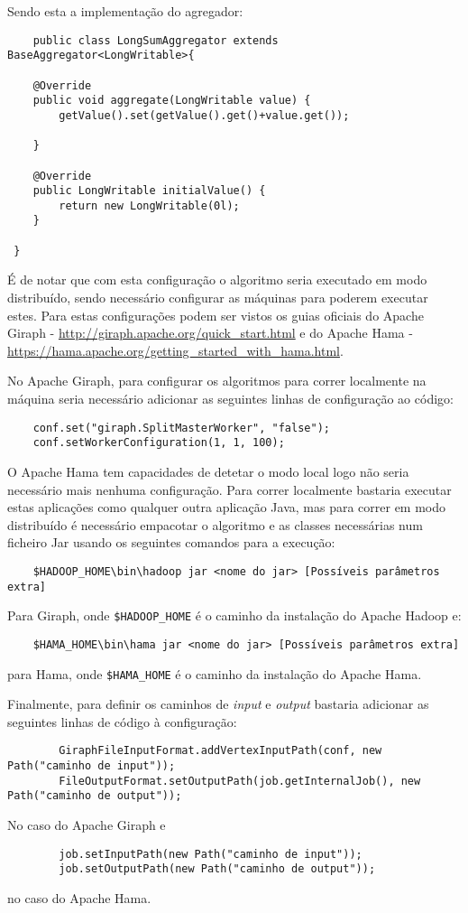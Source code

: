	Sendo esta a implementação do agregador:
	\begin{verbatim}
	public class LongSumAggregator extends BaseAggregator<LongWritable>{

	@Override
	public void aggregate(LongWritable value) {
		getValue().set(getValue().get()+value.get());
		
	}

	@Override
	public LongWritable initialValue() {
		return new LongWritable(0l);
	}

 }
	\end{verbatim}
	É de notar que com esta configuração o algoritmo seria executado em modo distribuído, sendo necessário configurar as máquinas para poderem executar estes. Para estas configurações podem ser vistos os guias oficiais do Apache Giraph - \url{http://giraph.apache.org/quick_start.html} e do Apache Hama - \url{https://hama.apache.org/getting_started_with_hama.html}.
	
	No Apache Giraph, para configurar os algoritmos para correr localmente na máquina seria necessário adicionar as seguintes linhas de configuração ao código:
	\begin{verbatim}
	conf.set("giraph.SplitMasterWorker", "false");
	conf.setWorkerConfiguration(1, 1, 100);
	\end{verbatim}
	
	O Apache Hama tem capacidades de detetar o modo local logo não seria necessário mais nenhuma configuração.
	\linebreak
	Para correr localmente bastaria executar estas aplicações como qualquer outra aplicação Java, mas para correr em modo distribuído é necessário empacotar o algoritmo e as classes necessárias num ficheiro Jar usando os seguintes comandos para a execução:
	\begin{verbatim}
	$HADOOP_HOME\bin\hadoop jar <nome do jar> [Possíveis parâmetros extra]
	\end{verbatim}
	Para Giraph, onde \verb|$HADOOP_HOME| é o caminho da instalação do Apache Hadoop e: 
	
	\begin{verbatim}
	$HAMA_HOME\bin\hama jar <nome do jar> [Possíveis parâmetros extra]
	\end{verbatim}
	para Hama, onde \verb|$HAMA_HOME| é o caminho da instalação do Apache Hama.
	
	Finalmente, para definir os caminhos de \textit{input} e \textit{output} bastaria adicionar as seguintes linhas de código à configuração:
	\begin{verbatim}
		GiraphFileInputFormat.addVertexInputPath(conf, new Path("caminho de input"));
		FileOutputFormat.setOutputPath(job.getInternalJob(), new Path("caminho de output"));
	\end{verbatim}
	No caso do Apache Giraph e
	\begin{verbatim}
		job.setInputPath(new Path("caminho de input"));
		job.setOutputPath(new Path("caminho de output"));
	\end{verbatim}
	no caso do Apache Hama.
